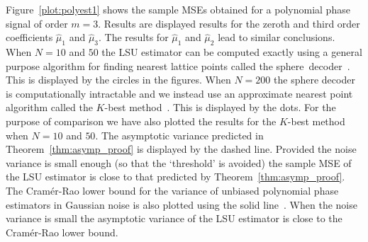 \documentclass[aap,preprint]{imsart}
\begin{document}
Figure~\ref{plot:polyest1} shows the sample MSEs obtained for a polynomial phase signal of order $m=3$.  Results are displayed results for the zeroth and third order coefficients $\widehat{\mu}_1$ and $\widehat{\mu}_3$.  The results for $\widehat{\mu}_1$ and $\widehat{\mu}_2$ lead to similar conclusions.  When $N = 10$ and $50$ the LSU estimator can be computed exactly using a general purpose algorithm for finding nearest lattice points called the sphere~decoder~\cite{Pohst_sphere_decoder_1981,Agrell2002,Viterbo_sphere_decoder_1999}.  This is displayed by the circles in the figures.  When $N=200$ the sphere decoder is computationally intractable and we instead use an approximate nearest point algorithm called the $K$-best method~\cite{Zhan2006_K_best_sphere_decoder}.  This is displayed by the dots.  For the purpose of comparison we have also plotted the results for the $K$-best method when $N = 10$ and $50$.  The asymptotic variance predicted in Theorem~\ref{thm:asymp_proof} is displayed by the dashed line.  Provided the noise variance is small enough (so that the `threshold' is avoided) the sample MSE of the LSU estimator is close to that predicted by Theorem~\ref{thm:asymp_proof}.  The Cram\'{e}r-Rao lower bound for the variance of unbiased polynomial phase estimators in Gaussian noise is also plotted using the solid line~\cite{Peleg1991_CRB_PPS_1991}.  When the noise variance is small the asymptotic variance of the LSU estimator is close to the Cram\'{e}r-Rao lower bound.  


 
\end{document}
